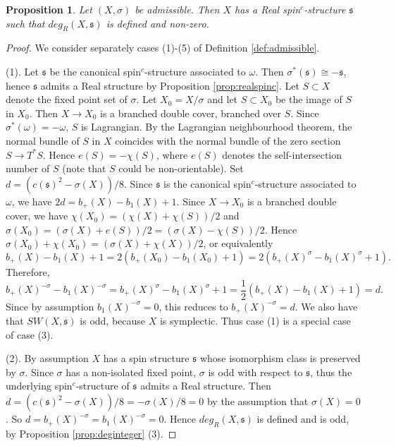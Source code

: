 \documentclass{amsart}
\newtheorem{proposition}[theorem]{Proposition}
\theoremstyle{definition}
\theoremstyle{remark}
\numberwithin{equation}{section}
\begin{document}
\begin{proposition}\label{prop:nzdeg}
Let $(X,\sigma)$ be admissible. Then $X$ has a Real spin$^c$-structure $\mathfrak{s}$ such that $deg_R(X,\mathfrak{s})$ is defined and non-zero.
\end{proposition}
\begin{proof}
We consider separately cases (1)-(5) of Definition \ref{def:admissible}.

(1). Let $\mathfrak{s}$ be the canonical spin$^c$-structure associated to $\omega$. Then $\sigma^*(\mathfrak{s}) \cong -\mathfrak{s}$, hence $\mathfrak{s}$ admits a Real structure by Proposition \ref{prop:realspinc}. Let $S \subset X$ denote the fixed point set of $\sigma$. Let $X_0 = X/\sigma$ and let $S \subset X_0$ be the image of $S$ in $X_0$. Then $X \to X_0$ is a branched double cover, branched over $S$. Since $\sigma^*(\omega) = -\omega$, $S$ is Lagrangian. By the Lagrangian neighbourhood theorem, the normal bundle of $S$ in $X$ coincides with the normal bundle of the zero section $S \to T^*S$. Hence $e(S) = -\chi(S)$, where $e(S)$ denotes the self-intersection number of $S$ (note that $S$ could be non-orientable). Set $d = (c(\mathfrak{s})^2 - \sigma(X))/8$. Since $\mathfrak{s}$ is the canonical spin$^c$-structure associated to $\omega$, we have $2d = b_+(X)-b_1(X) + 1$. Since $X \to X_0$ is a branched double cover, we have $\chi(X_0) = (\chi(X) + \chi(S))/2$ and $\sigma(X_0) = (\sigma(X) + e(S))/2 = (\sigma(X) - \chi(S))/2$. Hence $\sigma(X_0) + \chi(X_0) = (\sigma(X) + \chi(X))/2$, or equivalently
\[
b_+(X) - b_1(X) + 1 = 2( b_+(X_0) - b_1(X_0) + 1) = 2( b_+(X)^{\sigma} - b_1(X)^{\sigma} + 1).
\]
Therefore,
\[
b_+(X)^{-\sigma} - b_1(X)^{-\sigma} = b_+(X)^\sigma - b_1(X)^\sigma + 1 = \frac{1}{2}( b_+(X) - b_1(X) + 1) = d.
\]
Since by assumption $b_1(X)^{-\sigma} = 0$, this reduces to $b_+(X)^{-\sigma} = d$. We also have that $SW(X,\mathfrak{s})$ is odd, because $X$ is symplectic. Thus case (1) is a special case of case (3).

(2). By assumption $X$ has a spin structure $\mathfrak{s}$ whose isomorphism class is preserved by $\sigma$. Since $\sigma$ has a non-isolated fixed point, $\sigma$ is odd with respect to $\mathfrak{s}$, thus the underlying spin$^c$-structure of $\mathfrak{s}$ admits a Real structure. Then $d = (c(\mathfrak{s})^2 - \sigma(X))/8 = -\sigma(X)/8 = 0$ by the assumption that $\sigma(X) = 0$. So $d = b_+(X)^{-\sigma} = b_1(X)^{-\sigma} = 0$. Hence $deg_R(X,\mathfrak{s})$ is defined and is odd, by Proposition \ref{prop:deginteger} (3).


\end{proof}
\end{document}
